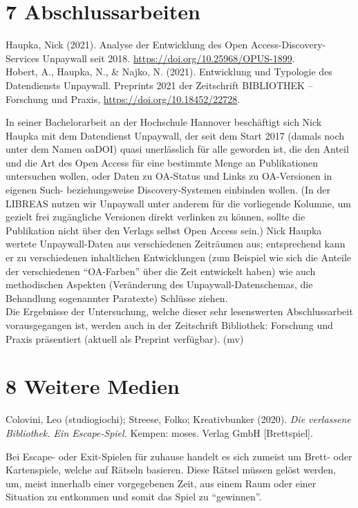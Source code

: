 \documentclass[a4paper,
fontsize=11pt,
oneside,
numbers=noperiodatend,
parskip=half-,
bibliography=totoc,
final
]{scrartcl}
\begin{document}
\hypertarget{abschlussarbeiten}{%
\section{7 Abschlussarbeiten}\label{abschlussarbeiten}}

Haupka, Nick (2021). Analyse der Entwicklung des Open
Access-Discovery-Services Unpaywall seit 2018.
\url{https://doi.org/10.25968/OPUS-1899}.\\
Hobert, A., Haupka, N., \& Najko, N. (2021). Entwicklung und Typologie
des Datendiensts Unpaywall. Preprints 2021 der Zeitschrift BIBLIOTHEK --
Forschung und Praxis, \url{https://doi.org/10.18452/22728}.

In seiner Bachelorarbeit an der Hochschule Hannover beschäftigt sich
Nick Haupka mit dem Datendienst Unpaywall, der seit dem Start 2017
(damals noch unter dem Namen oaDOI) quasi unerlässlich für alle geworden
ist, die den Anteil und die Art des Open Access für eine bestimmte Menge
an Publikationen untersuchen wollen, oder Daten zu OA-Status und Links
zu OA-Versionen in eigenen Such- beziehungsweise Discovery-Systemen
einbinden wollen. (In der LIBREAS nutzen wir Unpaywall unter anderem für
die vorliegende Kolumne, um gezielt frei zugängliche Versionen direkt
verlinken zu können, sollte die Publikation nicht über den Verlags
selbst Open Access sein.) Nick Haupka wertete Unpaywall-Daten aus
verschiedenen Zeiträumen aus; entsprechend kann er zu verschiedenen
inhaltlichen Entwicklungen (zum Beispiel wie sich die Anteile der
verschiedenen \enquote{OA-Farben} über die Zeit entwickelt haben) wie
auch methodischen Aspekten (Veränderung des Unpaywall-Datenschemas, die
Behandlung sogenannter Paratexte) Schlüsse ziehen.\\
Die Ergebnisse der Untersuchung, welche dieser sehr lesenswerten
Abschlussarbeit vorausgegangen ist, werden auch in der Zeitschrift
Bibliothek: Forschung und Praxis präsentiert (aktuell als Preprint
verfügbar). (mv)

\hypertarget{weitere-medien}{%
\section{8 Weitere Medien}\label{weitere-medien}}

Colovini, Leo (studiogiochi); Streese, Folko; Kreativbunker (2020).
\emph{Die verlassene Bibliothek. Ein Escape-Spiel.} Kempen: moses.
Verlag GmbH {[}Brettspiel{]}.

Bei Escape- oder Exit-Spielen für zuhause handelt es sich zumeist um
Brett- oder Kartenspiele, welche auf Rätseln basieren. Diese Rätsel
müssen gelöst werden, um, meist innerhalb einer vorgegebenen Zeit, aus
einem Raum oder einer Situation zu entkommen und somit das Spiel zu
\enquote{gewinnen}.
\end{document}
